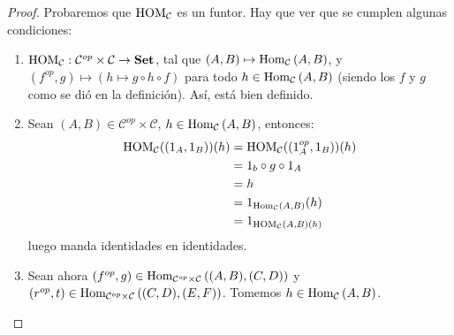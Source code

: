 \documentclass[12pt]{report}
\theoremstyle{largebreak}
\newcommand\cf[3]{\ensuremath{#1:#2\rightarrow#3}}
\newcommand{\Hom}[3]{\ensuremath{\textup{Hom}_{#1}\left(#2,#3\right)}}
\newcommand{\Cat}[1]{\ensuremath{\textup{\textbf{#1}}}}
\begin{document}
    \begin{proof}
        Probaremos que $\textup{HOM}_{\mathcal{C}}$ es un funtor. Hay que ver que se cumplen algunas condiciones:
        \begin{enumerate}
            \item $\cf{\HOM{\mathcal{C}}}{\mathcal{C}^{op}\times\mathcal{C}}{\Cat{Set}}$, tal que $(A,B)\mapsto\Hom{\mathcal{C}}{A}{B}$, y $(f^{op},g)\mapsto (h\mapsto g\circ h\circ f)$ para todo $h\in\Hom{\mathcal{C}}{A}{B}$ (siendo los $f$ y $g$ como se dió en la definición). Así, está bien definido.
            \item Sean $(A,B)\in\mathcal{C}^{op}\times\mathcal{C}$, $h\in\Hom{\mathcal{C}}{A}{B}$, entonces:
            \begin{equation*}
                \begin{split}
                    \HOM{\mathcal{C}}((1_A,1_B))(h)&=\HOM{\mathcal{C}}((1^{op}_A,1_B))(h)\\
                    &=1_b\circ g\circ 1_A\\
                    &=h\\
                    &=1_{ \Hom{\mathcal{C}}{A}{B}}(h)\\
                    &=1_{\HOM{\mathcal{C}}(A,B)(h)}
                \end{split}
            \end{equation*}
            luego manda identidades en identidades.
            \item Sean ahora $(f^{op},g)\in\Hom{\mathcal{C}^{op}\times\mathcal{C}}{(A,B)}{(C,D)}$ y $(r^{op},t)\in\Hom{\mathcal{C}^{op}\times\mathcal{C}}{(C,D)}{(E,F)}$. Tomemos $h\in\Hom{\mathcal{C}}{A}{B}$.
            

\end{enumerate}
\end{proof}
\end{document}
